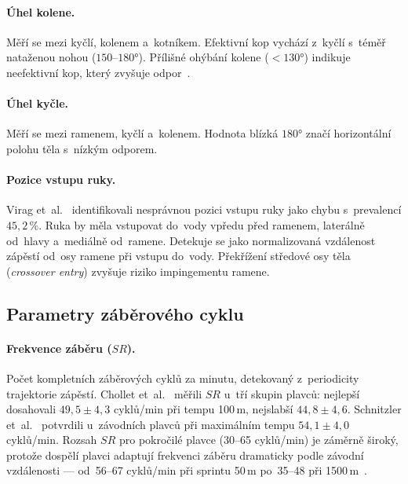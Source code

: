 \paragraph{Úhel kolene.} Měří se mezi kyčlí, kolenem a~kotníkem. Efektivní kop vychází z~kyčlí s~téměř nataženou nohou ($150$--$180°$). Přílišné ohýbání kolene ($<130°$) indikuje neefektivní  kop, který zvyšuje odpor~\cite{maglischo2003}.

\paragraph{Úhel kyčle.} Měří se mezi ramenem, kyčlí a~kolenem. Hodnota blízká $180°$ značí horizontální polohu těla s~nízkým odporem.

\paragraph{Pozice vstupu ruky.} Virag et~al.~\cite{virag2014} identifikovali nesprávnou pozici vstupu ruky jako chybu s~prevalencí $45{,}2\,\%$. Ruka by měla vstupovat do~vody vpředu před ramenem, laterálně od~hlavy a~mediálně od~ramene. Detekuje se jako normalizovaná vzdálenost zápěstí od~osy ramene při vstupu do~vody. Překřížení středové osy těla (\textit{crossover entry}) zvyšuje riziko impingementu ramene.

\subsection{Parametry záběrového cyklu}
\label{subsec:stroke_params}

\paragraph{Frekvence záběru ($SR$).} Počet kompletních záběrových cyklů za minutu, detekovaný z~periodicity trajektorie zápěstí. Chollet et~al.~\cite{chollet2000} měřili $SR$ u~tří skupin plavců: nejlepší dosahovali $49{,}5 \pm 4{,}3$ cyklů/min při tempu 100\,m, nejslabší $44{,}8 \pm 4{,}6$. Schnitzler et~al.~\cite{schnitzler2021} potvrdili u~závodních plavců při maximálním tempu $54{,}1 \pm 4{,}0$ cyklů/min. Rozsah $SR$ pro pokročilé plavce (30--65 cyklů/min) je záměrně široký, protože dospělí plavci adaptují frekvenci záběru dramaticky podle závodní vzdálenosti --- od~56--67 cyklů/min při sprintu 50\,m po~35--48 při 1500\,m~\cite{staunton2025}.

